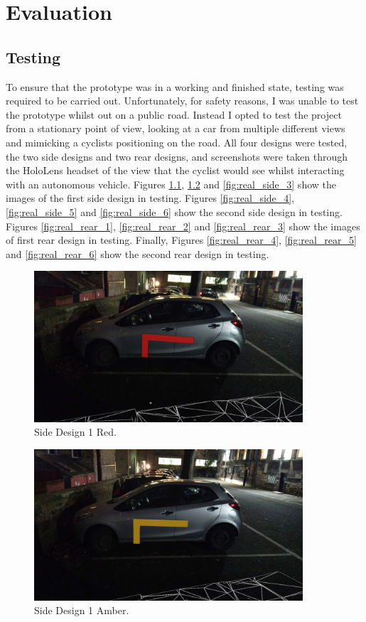 \documentclass{l4proj}
\begin{document}
\chapter{Evaluation}

\section{Testing}

To ensure that the prototype was in a working and finished state, testing was required to be carried out. Unfortunately, for safety reasons, I was unable to test the prototype whilst out on a public road. Instead I opted to test the project from a stationary point of view, looking at a car from multiple different views and mimicking a cyclists positioning on the road. All four designs were tested, the two side designs and two rear designs, and screenshots were taken through the HoloLens headset of the view that the cyclist would see whilst interacting with an autonomous vehicle. Figures \ref{fig:real_side_1}, \ref{fig:real_side_2} and \ref{fig:real_side_3} show the images of the first side design in testing. Figures \ref{fig:real_side_4}, \ref{fig:real_side_5} and \ref{fig:real_side_6} show the second side design in testing. Figures \ref{fig:real_rear_1}, \ref{fig:real_rear_2} and \ref{fig:real_rear_3} show the images of first rear design in testing. Finally, Figures \ref{fig:real_rear_4}, \ref{fig:real_rear_5} and \ref{fig:real_rear_6} show the second rear design in testing.

\begin{figure}[H]
    \centering
    \includegraphics[width=10cm]{images/001.jpg}
    \caption{Side Design 1 Red.}
    \label{fig:real_side_1}
\end{figure}

\begin{figure}[H]
    \centering
    \includegraphics[width=10cm]{images/002.jpg}
    \caption{Side Design 1 Amber.}
    \label{fig:real_side_2}
\end{figure}
\end{document}
